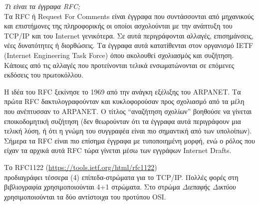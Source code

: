 \begin{inthebox}
\emph{Τι είναι τα έγγραφα RFC;}\\

Τα RFC ή Request For Comments είναι έγγραφα που συντάσσονται από μηχανικούς και επιστήμονες της πληροφορικής οι οποίοι ασχολούνται με την ανάπτυξη του TCP/IP και του Internet γενικότερα. Σε αυτά περιγράφονται αλλαγές, επισημάνσεις, νέες δυνατότητες ή διορθώσεις. Τα έγγραφα αυτά κατατίθενται στον οργανισμό IETF (Internet Engineering Task Force) όπου ακολουθεί σχολιασμός και συζήτηση. Κάποιες από τις αλλαγές που προτείνονται τελικά ενσωματώνονται σε επόμενες εκδόσεις του πρωτοκόλλου. 

Η ιδέα του RFC ξεκίνησε το 1969 από την ανάγκη εξέλιξης του ARPANET. Τα πρώτα RFC δακτυλογραφούνταν και κυκλοφορούσαν προς σχολιασμό από τα μέλη που ανέπτυσσαν το ARPANET. Ο τίτλος ``αναζήτηση σχολίων'' βοηθούσε να γίνεται εποικοδομητική συζήτηση (δεν θεωρούνταν ότι τα έγγραφα αυτά περιγράφουν μια τελική λύση, ή ότι η γνώμη του συγγραφέα είναι πιο σημαντική από των υπολοίπων). Σήμερα τα RFC είναι πιο επίσημα έγγραφα με τυποποιημένη μορφή, ενώ ο ρόλος που είχαν τα αρχικά αυτά RFC τώρα γίνεται μέσω των εγγράφων Internet Drafts.\\
\end{inthebox}

Το RFC1122 (\url{https://tools.ietf.org/html/rfc1122})\\ προδιαγράφει τέσσερα (4) επίπεδα-στρώματα για το TCP/IP. Πολλές φορές στη βιβλιογραφία χρησιμοποιούνται 4+1 στρώματα. Στο στρώμα \emph{Διεπαφής Δικτύου} χρησιμοποιούνται τα δύο αντίστοιχα του προτύπου OSI.

